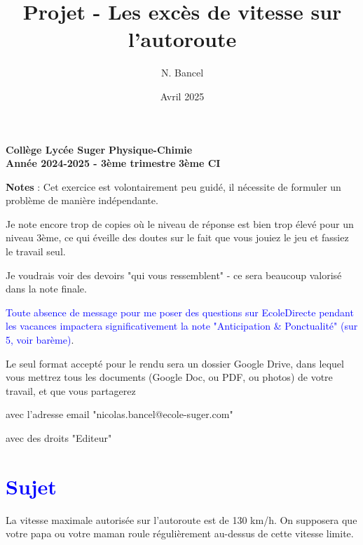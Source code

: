 \documentclass[a4paper,12pt]{article}
\title{Projet - Les excès de vitesse sur l'autoroute}
\author{N. Bancel}
\date{Avril 2025}
\begin{document}
\textbf{Collège Lycée Suger}
\hfill
\textbf{Physique-Chimie} \\

\textbf{Année 2024-2025 - 3ème trimestre}
\hfill
\textbf{3ème CI} \par

{\let\newpage\relax\maketitle}

\begin{tcolorbox}[colback=gray!30, colframe=black]
  \textbf{Notes} : Cet exercice est volontairement peu guidé, il nécessite de formuler un problème de manière indépendante.
  
  \begin{compactitem}
    \item Je note encore trop de copies où le niveau de réponse est bien trop élevé pour un niveau 3ème, ce qui éveille des doutes sur le fait que vous jouiez le jeu et fassiez le travail seul.
    \item Je voudrais voir des devoirs "qui vous ressemblent" - ce sera beaucoup valorisé dans la note finale.
    \item \textcolor{blue}{Toute absence de message pour me poser des questions sur EcoleDirecte pendant les vacances impactera significativement la note "Anticipation \& Ponctualité" (sur 5, voir barème)}.
  \end{compactitem}
  
  \vspace{1em}
  Le seul format accepté pour le rendu sera un dossier Google Drive, dans lequel vous mettrez tous les documents (Google Doc, ou PDF, ou photos) de votre travail, et que vous partagerez
  \begin{compactenum}
    \item avec l'adresse email "nicolas.bancel@ecole-suger.com" 
    \item avec des droits "Editeur"
  \end{compactenum}
  \end{tcolorbox}

\section*{\textcolor{blue}{Sujet}}

La vitesse maximale autorisée sur l'autoroute est de \num{130} \unit[per-mode = symbol]{\kilo\meter\per\hour}.
On supposera que votre papa ou votre maman roule régulièrement au-dessus de cette vitesse limite. \par
\end{document}

